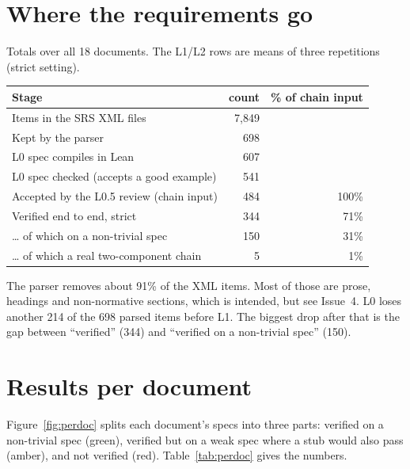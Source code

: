 \documentclass[10pt,a4paper]{article}
\begin{document}
\section{Where the requirements go}
Totals over all 18 documents. The L1/L2 rows are means of three repetitions (strict setting).

\begin{center}
\begin{tabular}{@{}lrr@{}}
\toprule
Stage & count & \% of chain input \\
\midrule
Items in the SRS XML files                     & 7{,}849 & \\
Kept by the parser                             & 698     & \\
L0 spec compiles in Lean                       & 607     & \\
L0 spec checked (accepts a good example)       & 541     & \\
Accepted by the L0.5 review (chain input)      & 484     & 100\% \\
\midrule
Verified end to end, strict                    & 344     & 71\% \\
\quad \dots{} of which on a non-trivial spec   & 150     & 31\% \\
\quad \dots{} of which a real two-component chain & 5    & 1\% \\
\bottomrule
\end{tabular}
\end{center}

The parser removes about 91\% of the XML items. Most of those are prose, headings and non-normative sections, which is
intended, but see Issue~4. L0 loses another 214 of the 698 parsed items before L1. The biggest drop after that is the gap
between ``verified'' (344) and ``verified on a non-trivial spec'' (150).

\section{Results per document}
Figure~\ref{fig:perdoc} splits each document's specs into three parts: verified on a non-trivial spec (green), verified but
on a weak spec where a stub would also pass (amber), and not verified (red). Table~\ref{tab:perdoc} gives the numbers.
\end{document}
